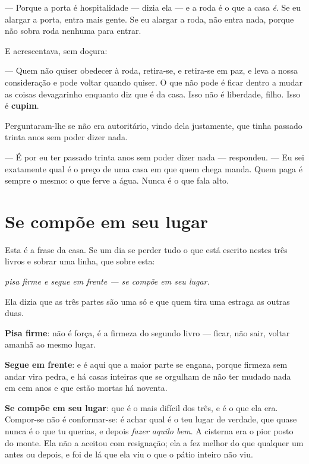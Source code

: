 \documentclass[livro.tex]{subfiles}
\begin{document}
\medskip

--- Porque a porta é hospitalidade --- dizia ela --- e a roda é o que a casa \emph{é}. Se eu
alargar a porta, entra mais gente. Se eu alargar a roda, não entra nada, porque não sobra roda
nenhuma para entrar.

E acrescentava, sem doçura:

--- Quem não quiser obedecer à roda, retira-se, e retira-se em paz, e leva a nossa consideração e
pode voltar quando quiser. O que não pode é ficar dentro a mudar as coisas devagarinho enquanto
diz que é da casa. Isso não é liberdade, filho. Isso é \textbf{cupim}.

\medskip

Perguntaram-lhe se não era autoritário, vindo dela justamente, que tinha passado trinta anos sem
poder dizer nada.

--- É por eu ter passado trinta anos sem poder dizer nada --- respondeu. --- Eu sei exatamente
qual é o preço de uma casa em que quem chega manda. Quem paga é sempre o mesmo: o que ferve a
água. Nunca é o que fala alto.

\chapter{Se compõe em seu lugar}

Esta é a frase da casa. Se um dia se perder tudo o que está escrito nestes três livros e sobrar
uma linha, que sobre esta:

\begin{center}
\emph{pisa firme e segue em frente --- se compõe em seu lugar.}
\end{center}

\medskip

Ela dizia que as três partes são uma só e que quem tira uma estraga as outras duas.

\textbf{Pisa firme}: não é força, é a firmeza do segundo livro --- ficar, não sair, voltar amanhã
ao mesmo lugar.

\textbf{Segue em frente}: e é aqui que a maior parte se engana, porque firmeza sem andar vira
pedra, e há casas inteiras que se orgulham de não ter mudado nada em cem anos e que estão mortas
há noventa.

\textbf{Se compõe em seu lugar}: que é o mais difícil dos três, e é o que ela era. Compor-se não
é conformar-se: é achar qual é o teu lugar de verdade, que quase nunca é o que tu querias, e
depois \emph{fazer aquilo bem}. A cisterna era o pior posto do monte. Ela não a aceitou com
resignação; ela a fez melhor do que qualquer um antes ou depois, e foi de lá que ela viu o que o
pátio inteiro não viu.
\end{document}
